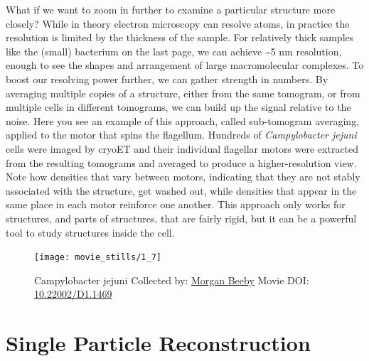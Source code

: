 \documentclass[]{tufte-book}
\begin{document}
What if we want to zoom in further to examine a particular structure
more closely? While in theory electron microscopy can resolve atoms, in
practice the resolution is limited by the thickness of the sample. For
relatively thick samples like the (small) bacterium on the last page, we
can achieve \textasciitilde{}5 nm resolution, enough to see the shapes
and arrangement of large macromolecular complexes. To boost our
resolving power further, we can gather strength in numbers. By averaging
multiple copies of a structure, either from the same tomogram, or from
multiple cells in different tomograms, we can build up the signal
relative to the noise. Here you see an example of this approach, called
sub-tomogram averaging, applied to the motor that spins the flagellum.
Hundreds of \emph{Campylobacter jejuni} cells were imaged by cryoET and
their individual flagellar motors were extracted from the resulting
tomograms and averaged to produce a higher-resolution view. Note how
densities that vary between motors, indicating that they are not stably
associated with the structure, get washed out, while densities that
appear in the same place in each motor reinforce one another. This
approach only works for structures, and parts of structures, that are
fairly rigid, but it can be a powerful tool to study structures inside
the cell.





\begin{figure}
\texttt{[image: movie\_stills/1\_7]} \caption[Campylobacter jejuni Collected by:
\protect\hyperlink{morgan_beeby}{Morgan Beeby} Movie DOI:
\href{https://doi.org/10.22002/D1.1469}{10.22002/D1.1469}]{Campylobacter jejuni Collected by:
\protect\hyperlink{morgan_beeby}{Morgan Beeby} Movie DOI:
\href{https://doi.org/10.22002/D1.1469}{10.22002/D1.1469}}\label{fig:1-7}
\end{figure}

\section{Single Particle
Reconstruction}\label{single-particle-reconstruction}
\end{document}
